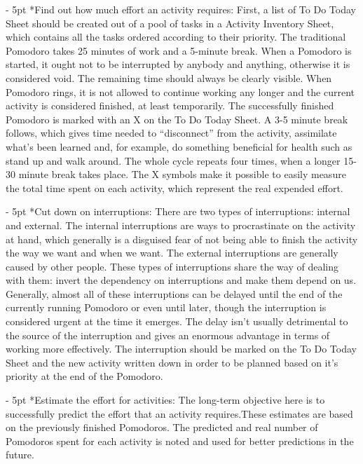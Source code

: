 \documentclass[11pt,singleside]{myfithesis2}
\makeatletter
\renewcommand\paragraph{
   \vspace{-10pt}
   \@startsection{paragraph}{4}{0mm}
      {\baselineskip}
      {- 5pt}
      {\normalfont\normalsize\bfseries}
}
\makeatother
\begin{document}
\paragraph*{Find out how much effort an activity requires: } First, a list of To Do Today Sheet should be created out of a pool of tasks in a Activity Inventory Sheet, which contains all the tasks ordered according to their priority. The traditional Pomodoro takes 25 minutes of work and a 5-minute break. When a Pomodoro is started, it ought not to be interrupted by anybody and anything, otherwise it is considered void. The remaining time should always be clearly visible. When Pomodoro rings, it is not allowed to continue working any longer and the current activity is considered finished, at least temporarily. The successfully finished Pomodoro is marked with an X on the To Do Today Sheet. A 3-5 minute break follows, which gives time needed to ``disconnect'' from the activity, assimilate what's been learned and, for example, do something beneficial for health such as stand up and walk around. The whole cycle repeats four times, when a longer 15-30 minute break takes place. The X symbols make it possible to easily measure the total time spent on each activity, which represent the real expended effort.
\paragraph*{Cut down on interruptions: } There are two types of interruptions: internal and external. The internal interruptions are ways to procrastinate on the activity at hand, which generally is a disguised fear of not being able to finish the activity the way we want and when we want. The external interruptions are generally caused by other people. These types of interruptions share the way of dealing with them: invert the dependency on interruptions and make them depend on us. Generally, almost all of these interruptions can be delayed until the end of the currently running Pomodoro or even until later, though the interruption is considered urgent at the time it emerges. The delay isn't usually detrimental to the source of the interruption and gives an enormous advantage in terms of working more effectively. The interruption should be marked on the To Do Today Sheet and the new activity written down in order to be planned based on it's priority at the end of the Pomodoro.
\paragraph*{Estimate the effort for activities: } The long-term objective here is to successfully predict the effort that an activity requires.These estimates are based on the previously finished Pomodoros. The predicted and real number of Pomodoros spent for each activity is noted and used for better predictions in the future.
\end{document}
